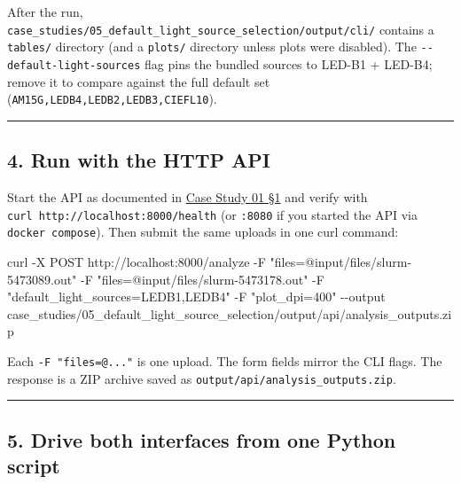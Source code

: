 \documentclass[
  11pt,
]{article}
\newenvironment{Shaded}{}{}
\newcommand{\AttributeTok}[1]{\textcolor[rgb]{0.49,0.56,0.16}{#1}}
\newcommand{\ExtensionTok}[1]{#1}
\newcommand{\NormalTok}[1]{#1}
\newcommand{\StringTok}[1]{\textcolor[rgb]{0.25,0.44,0.63}{#1}}
\begin{document}
After the run,
\texttt{case\_studies/05\_default\_light\_source\_selection/output/cli/}
contains a \texttt{tables/} directory (and a \texttt{plots/} directory
unless plots were disabled). The \texttt{-\/-default-light-sources} flag
pins the bundled sources to LED-B1 + LED-B4; remove it to compare
against the full default set (\texttt{AM15G,LEDB4,LEDB2,LEDB3,CIEFL10}).

\begin{center}\rule{0.5\linewidth}{0.5pt}\end{center}

\hypertarget{4-run-with-the-http-api}{
\subsection{4. Run with the HTTP API}\label{4-run-with-the-http-api}}

Start the API as documented in
\href{https://github.com/pinarsyt/overlap-calculator/blob/main/case_studies/01_theoretical_only/README.md\#1-prerequisites}{Case
Study 01 §1} and verify with
\texttt{curl\ http://localhost:8000/health} (or \texttt{:8080} if you
started the API via \texttt{docker\ compose}). Then submit the same
uploads in one curl command:

\begin{Shaded}
\begin{Highlighting}[]
\ExtensionTok{curl} \AttributeTok{{-}X}\NormalTok{ POST http://localhost:8000/analyze }\AttributeTok{{-}F} \StringTok{"files=@input/files/slurm{-}5473089.out"} \AttributeTok{{-}F} \StringTok{"files=@input/files/slurm{-}5473178.out"} \AttributeTok{{-}F} \StringTok{"default\_light\_sources=LEDB1,LEDB4"} \AttributeTok{{-}F} \StringTok{"plot\_dpi=400"} \AttributeTok{{-}{-}output}\NormalTok{ case\_studies/05\_default\_light\_source\_selection/output/api/analysis\_outputs.zip}
\end{Highlighting}
\end{Shaded}

Each \texttt{-F\ "files=@..."} is one upload. The form fields mirror the
CLI flags. The response is a ZIP archive saved as
\texttt{output/api/analysis\_outputs.zip}.

\begin{center}\rule{0.5\linewidth}{0.5pt}\end{center}

\hypertarget{5-drive-both-interfaces-from-one-python-script}{
\subsection{5. Drive both interfaces from one Python
script}\label{5-drive-both-interfaces-from-one-python-script}}
\end{document}
